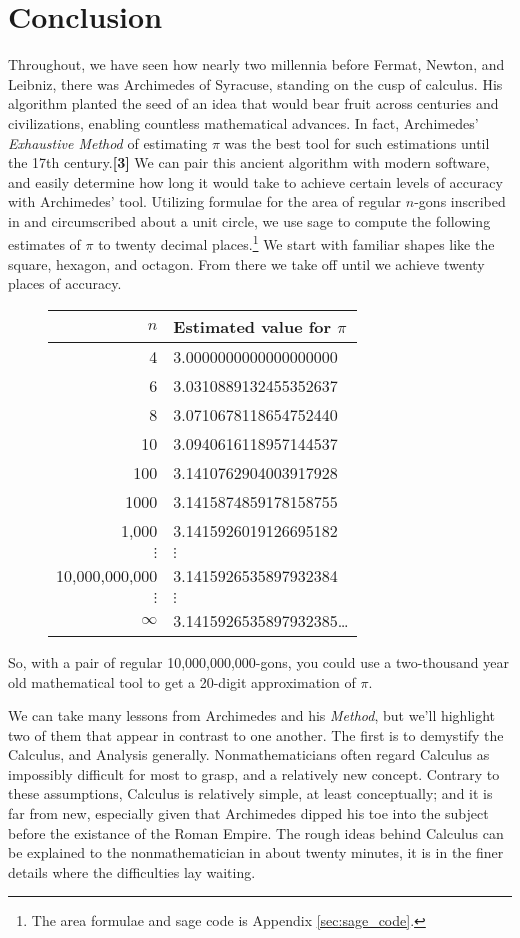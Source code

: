 \documentclass[letterpaper, 12pt]{amsart}
\theoremstyle{definition}  %
\begin{document}
	\section{Conclusion}
	\label{sec:conclusion}
	Throughout, we have seen how nearly two millennia before Fermat, Newton, and Leibniz, there was Archimedes of Syracuse, standing on the cusp of calculus.
	His algorithm planted the seed of an idea that would bear fruit across centuries and civilizations, enabling countless mathematical advances.
	In fact, Archimedes' \textit{Exhaustive Method} of estimating $\pi$ was the best tool for such estimations until the 17th century.\textbf{[3]}
	We can pair this ancient algorithm with modern software, and easily determine how long it would take to achieve certain levels of accuracy with Archimedes' tool.
	Utilizing formulae for the area of regular $n$-gons inscribed in and circumscribed about a unit circle, we use sage to compute the following estimates of $\pi$ to twenty decimal places.\footnote{The area formulae and sage code is Appendix \ref{sec:sage_code}.}
	We start with familiar shapes like the square, hexagon, and octagon.
	From there we take off until we achieve twenty places of accuracy.
		\begin{figure}[h]
			\begin{tabular}{r|l}
				$n$ & Estimated value for $\pi$ \\
				\hline
				4 & 3.0000000000000000000 \\
				6 & 3.0310889132455352637 \\
				8 & 3.0710678118654752440 \\
				10 & 3.0940616118957144537 \\
				100 & 3.1410762904003917928 \\
				1000 & 3.1415874859178158755 \\
				1,000 & 3.1415926019126695182 \\
				$\vdots$ & $\vdots$ \\
				10,000,000,000 & 3.1415926535897932384 \\
				$\vdots$ & $\vdots$ \\
				$\infty$ & 3.1415926535897932385\dots 
			\end{tabular}
		\end{figure}

	So, with a pair of regular 10,000,000,000-gons, you could use a two-thousand year old mathematical tool to get a 20-digit approximation of $\pi$.

	We can take many lessons from Archimedes and his \textit{Method}, but we'll highlight two of them that appear in contrast to one another.
	The first is to demystify the Calculus, and Analysis generally.
	Nonmathematicians often regard Calculus as impossibly difficult for most to grasp, and a relatively new concept.
	Contrary to these assumptions, Calculus is relatively simple, at least conceptually; and it is far from new, especially given that Archimedes dipped his toe into the subject before the existance of the Roman Empire.
	The rough ideas behind Calculus can be explained to the nonmathematician in about twenty minutes, it is in the finer details where the difficulties lay waiting.
	
\end{document}
